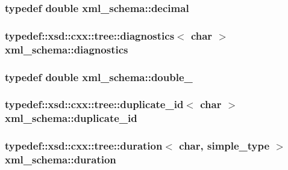 \subsubsection[{\texorpdfstring{decimal}{decimal}}]{\setlength{\rightskip}{0pt plus 5cm}typedef double {\bf xml\+\_\+schema\+::decimal}}\hypertarget{namespacexml__schema_a69bfaf24f63a8c18ebd8e21db6b343df}{}\label{namespacexml__schema_a69bfaf24f63a8c18ebd8e21db6b343df}
\subsubsection[{\texorpdfstring{diagnostics}{diagnostics}}]{\setlength{\rightskip}{0pt plus 5cm}typedef\+::xsd\+::cxx\+::tree\+::diagnostics$<$ char $>$ {\bf xml\+\_\+schema\+::diagnostics}}\hypertarget{namespacexml__schema_a0d9a5a38c30964872464e338625301d8}{}\label{namespacexml__schema_a0d9a5a38c30964872464e338625301d8}
\subsubsection[{\texorpdfstring{double\+\_\+}{double_}}]{\setlength{\rightskip}{0pt plus 5cm}typedef double {\bf xml\+\_\+schema\+::double\+\_\+}}\hypertarget{namespacexml__schema_aac2d3d3483d3a20e8d96d2e8e5b3a470}{}\label{namespacexml__schema_aac2d3d3483d3a20e8d96d2e8e5b3a470}
\subsubsection[{\texorpdfstring{duplicate\+\_\+id}{duplicate_id}}]{\setlength{\rightskip}{0pt plus 5cm}typedef\+::xsd\+::cxx\+::tree\+::duplicate\+\_\+id$<$ char $>$ {\bf xml\+\_\+schema\+::duplicate\+\_\+id}}\hypertarget{namespacexml__schema_a6dc417261c18af4fcce090133dd605f8}{}\label{namespacexml__schema_a6dc417261c18af4fcce090133dd605f8}
\subsubsection[{\texorpdfstring{duration}{duration}}]{\setlength{\rightskip}{0pt plus 5cm}typedef\+::xsd\+::cxx\+::tree\+::duration$<$ char, {\bf simple\+\_\+type} $>$ {\bf xml\+\_\+schema\+::duration}}\hypertarget{namespacexml__schema_a1acfdda85b50d50b1718ab6917a8f993}{}\label{namespacexml__schema_a1acfdda85b50d50b1718ab6917a8f993}
